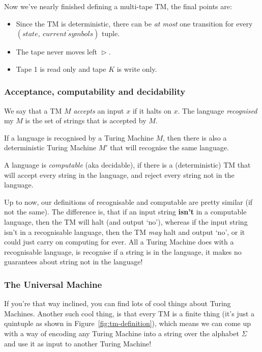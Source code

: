 Now we've nearly finished defining a multi-tape TM, the final points are:

\begin{itemize}
  \item Since the TM is deterministic, there can be \textit{at most} one 
    transition for every $(state,~\bar{current~symbols})$ tuple.
  \item The tape never moves left $\vartriangleright$.
  \item Tape 1 is read only and tape $K$ is write only.
\end{itemize}

\subsubsection{Acceptance, computability and decidability}

We say that a TM $M$ \textit{accepts} an input $x$ if it halts on $x$. The
language \textit{recognised} my $M$ is the set of strings that is accepted by
$M$.


If a language is recognised by a Turing Machine $M$, then there is also a 
deterministic Turing Machine $M'$ that will recognise the same language. 

A language is \textit{computable} (aka decidable), if there is a (deterministic)
TM that will accept every string in the language, and reject every string not in
the language.

Up to now, our definitions of recognisable and computable are pretty similar (if
not the same). The difference is, that if an input string \textbf{isn't} in a
computable language, then the TM will halt (and output `no'), whereas if the
input string isn't in a recognisable language, then the TM \textit{may} halt and
output `no', or it could just carry on computing for ever. All a Turing Machine
does with a recognisable language, is recognise if a string is in the language,
it makes no guarantees about string not in the language!

\subsubsection{The Universal Machine}

If you're that way inclined, you can find lots of cool things about Turing
Machines. Another such cool thing, is that every TM is a finite thing (it's just
a quintuple as shown in Figure~\ref{fig:tm-definition}), which means we can come
up with a way of encoding any Turing Machine into a string over the alphabet
$\Sigma$ and use it as input to another Turing Machine!


